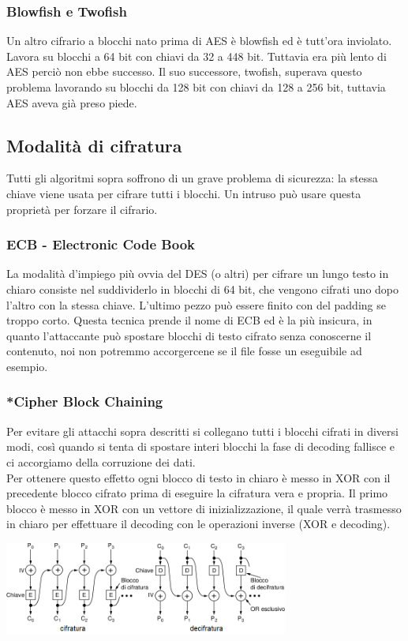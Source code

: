 \documentclass[10pt,a4paper,twoside]{article}
\begin{document}
\subsubsection{Blowfish e Twofish}
Un altro cifrario a blocchi nato prima di AES è blowfish ed è tutt'ora inviolato. Lavora su blocchi a 64 bit con chiavi da 32 a 448 bit. Tuttavia era più lento di AES perciò non ebbe successo. Il suo successore, twofish, superava questo problema lavorando su blocchi da 128 bit con chiavi da 128 a 256 bit, tuttavia AES aveva già preso piede.

\subsection{Modalità di cifratura}
Tutti gli algoritmi sopra soffrono di un grave problema di sicurezza: la stessa chiave viene usata per cifrare tutti i blocchi. Un intruso può usare questa proprietà per forzare il cifrario.

\subsubsection{ECB - Electronic Code Book}
La modalità d'impiego più ovvia del DES (o altri) per cifrare un lungo testo in chiaro consiste nel suddividerlo in blocchi di 64 bit, che vengono cifrati uno dopo l'altro con la stessa chiave. L'ultimo pezzo può essere finito con del padding se troppo corto. Questa tecnica prende il nome di ECB ed è la più insicura, in quanto l'attaccante può spostare blocchi di testo cifrato senza conoscerne il contenuto, noi non potremmo accorgercene se il file fosse un eseguibile ad esempio.

\subsubsection{*Cipher Block Chaining}
Per evitare gli attacchi sopra descritti si collegano tutti i blocchi cifrati in diversi modi, così quando si tenta di spostare interi blocchi la fase di decoding fallisce e ci accorgiamo della corruzione dei dati.\\
Per ottenere questo effetto ogni blocco di testo in chiaro è messo in XOR con il precedente blocco cifrato prima di eseguire la cifratura vera e propria. Il primo blocco è messo in XOR con un vettore di inizializzazione, il quale verrà trasmesso in chiaro per effettuare il decoding con le operazioni inverse (XOR e decoding).
\begin{center}
\includegraphics[width=0.7\textwidth]{images/cipher_block_chaining.png}
\end{center}
\end{document}
